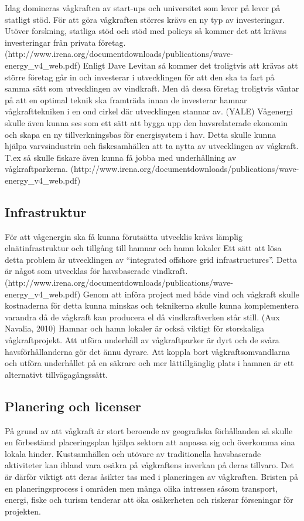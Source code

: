 \documentclass[10pt,a4paper,oneside]{article}
\begin{document}
Idag domineras vågkraften av start-ups och universitet som lever på lever på statligt stöd. För att göra vågkraften störres krävs en ny typ av investeringar. Utöver forskning, statliga stöd och stöd med policys så kommer det att krävas investeringar från privata företag. (http://www.irena.org/documentdownloads/publications/wave-energy_v4_web.pdf) Enligt Dave Levitan så kommer det troligtvis att krävas att större företag går in och investerar i utvecklingen för att den ska ta fart på samma sätt som utvecklingen av vindkraft. Men då dessa företag troligtvis väntar på att en optimal teknik ska framträda innan de investerar hamnar vågkrafttekniken i en ond cirkel där utvecklingen stannar av. (YALE) Vågenergi skulle även kunna ses som ett sätt att bygga upp den havsrelaterade ekonomin och skapa en ny tillverkningsbas för energisystem i hav. Detta skulle kunna hjälpa varvsindustrin och fiskesamhällen att ta nytta av utvecklingen av vågkraft. T.ex så skulle fiskare även kunna få jobba med underhållning av vågkraftparkerna. (http://www.irena.org/documentdownloads/publications/wave-energy_v4_web.pdf)

\subsection{Infrastruktur}
För att vågenergin ska få kunna förutsätta utvecklis krävs lämplig elnätinfrastruktur och tillgång till hamnar och hamn lokaler Ett sätt att lösa detta problem är utvecklingen av “integrated offshore grid infrastructures”. Detta är något som utvecklas för havsbaserade vindkraft. (http://www.irena.org/documentdownloads/publications/wave-energy_v4_web.pdf) Genom att införa project med både vind och vågkraft skulle kostnaderna för detta kunna minskas och teknikerna skulle kunna komplementera varandra då de vågkraft kan producera el då vindkraftverken står still. (Aux Navalia, 2010) Hamnar och hamn lokaler är också viktigt för storskaliga vågkraftprojekt. Att utföra underhåll av vågkraftparker är dyrt och de svåra havsförhållanderna gör det ännu dyrare. Att koppla bort vågkraftsomvandlarna och utföra underhållet på en säkrare och mer lättillgänglig plats i hamnen är ett alternativt tillvägagångssätt. 

\subsection{Planering och licenser}
På grund av att vågkraft är stort beroende av geografiska förhållanden så skulle en förbestämd placeringsplan hjälpa sektorn att anpassa sig och överkomma sina lokala hinder. Kustsamhällen och utövare av traditionella havsbaserade aktiviteter kan ibland vara osäkra på vågkraftens inverkan på deras tillvaro. Det är därför viktigt att deras åsikter tas med i planeringen av vågkraften. Bristen på en planeringsprocess i områden men många olika intressen såsom transport, energi, fiske och turism tenderar att öka osäkerheten och riskerar förseningar för projekten. 
\end{document}
